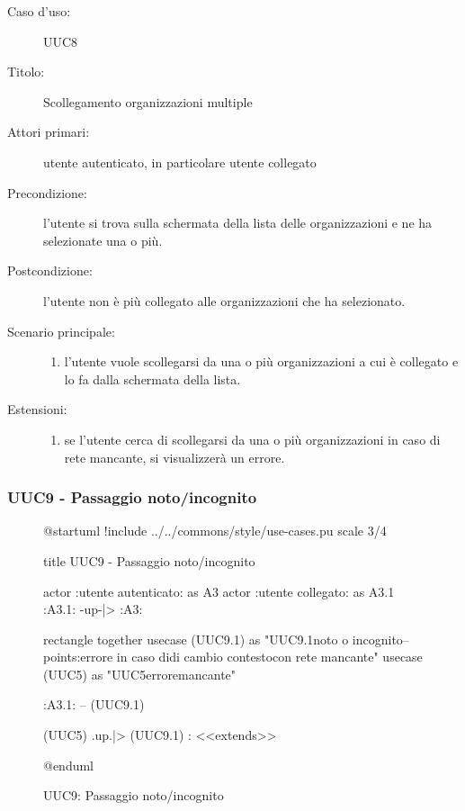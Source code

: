 \documentclass[casi-duso]{subfiles}
\begin{document}
\begin{description}
  \item[Caso d’uso:] UUC8
  \item[Titolo:] Scollegamento organizzazioni multiple
  \item[Attori primari:] utente autenticato, in particolare utente collegato
  \item[Precondizione:] l'utente si trova sulla schermata della lista delle organizzazioni e ne ha selezionate una o più.
  \item[Postcondizione:] l'utente non è più collegato alle organizzazioni che ha selezionato.
  \item[Scenario principale:]
        \begin{enumerate}
          \item l'utente vuole scollegarsi da una o più organizzazioni a cui è collegato e lo fa dalla schermata della lista.
        \end{enumerate}
  \item[Estensioni:]
        \begin{enumerate}
          \item se l'utente cerca di scollegarsi da una o più organizzazioni in caso di rete mancante, si visualizzerà un errore.
        \end{enumerate}
\end{description}

\subsubsection{UUC9 - Passaggio noto/incognito}%
\label{subsub:UUC9utente}

\begin{figure}[h!] 
  \centering 
  \begin{plantuml}
  @startuml
  !include ../../commons/style/use-cases.pu
  scale 3/4

  title UUC9 - Passaggio noto/incognito

  actor :utente autenticato: as A3
  actor :utente collegato: as A3.1
  :A3.1: -up-|> :A3:

  rectangle {
    together {
      usecase (UUC9.1) as "UUC9.1\nScelta noto o incognito\n--\nExtension points:\nVisualizzazione errore in caso di\noperazione di cambio contesto\n con rete mancante"
      usecase (UUC5) as "UUC5\nVisualizzazione errore\nrete mancante"
    }
  }

  :A3.1: -- (UUC9.1)

  (UUC5) .up.|> (UUC9.1) : <<extends>>

  @enduml
  \end{plantuml} 
  \caption{UUC9: Passaggio noto/incognito} 
  \label{fig:uuc9} 
\end{figure}
\end{document}
